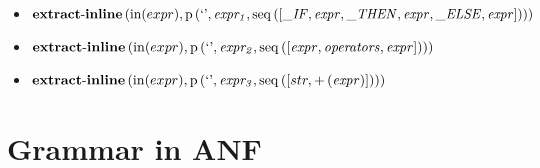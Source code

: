 {\begin{itemize}
\item $\mathbf{extract\text{-}inline}\left(\mathrm{in}(expr),\\\mathrm{p}\left(\text{`'},\mathit{expr_1},\mathrm{seq}\left(\left[\mathit{\_ IF}, \mathit{expr}, \mathit{\_ THEN}, \mathit{expr}, \mathit{\_ ELSE}, \mathit{expr}\right]\right)\right)\right)$
\item $\mathbf{extract\text{-}inline}\left(\mathrm{in}(expr),\\\mathrm{p}\left(\text{`'},\mathit{expr_2},\mathrm{seq}\left(\left[\mathit{expr}, \mathit{operators}, \mathit{expr}\right]\right)\right)\right)$
\item $\mathbf{extract\text{-}inline}\left(\mathrm{in}(expr),\\\mathrm{p}\left(\text{`'},\mathit{expr_3},\mathrm{seq}\left(\left[str, {+}\left(\mathit{expr}\right)\right]\right)\right)\right)$
\end{itemize}}

\section{Grammar in ANF}

